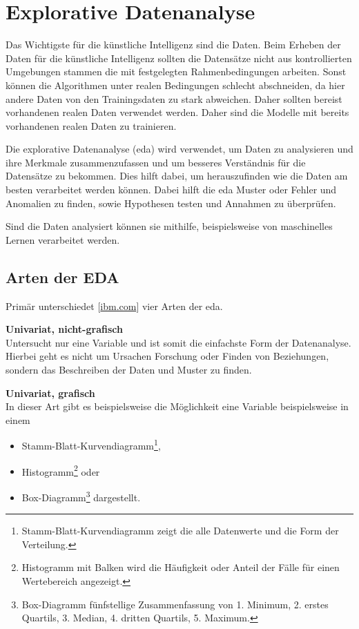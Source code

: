\chapter{Explorative Datenanalyse}
Das Wichtigste für die künstliche Intelligenz sind die Daten. Beim Erheben der Daten für die künstliche Intelligenz sollten die Datensätze nicht aus kontrollierten Umgebungen stammen die mit festgelegten Rahmenbedingungen arbeiten. Sonst können die Algorithmen unter realen Bedingungen schlecht abschneiden, da hier andere Daten von den Trainingsdaten zu stark abweichen. Daher sollten bereist vorhandenen realen Daten verwendet werden. Daher sind die Modelle mit bereits vorhandenen realen Daten zu trainieren.\vspace{0.2cm}

Die explorative Datenanalyse (\Gls{eda}) wird verwendet, um Daten zu analysieren und ihre Merkmale zusammenzufassen und um besseres Verständnis für die Datensätze zu bekommen. Dies hilft dabei, um herauszufinden wie die Daten am besten verarbeitet werden können. Dabei hilft die \Gls{eda} Muster oder Fehler und Anomalien zu finden, sowie Hypothesen testen und Annahmen zu überprüfen.\vspace{0.2cm}

Sind die Daten analysiert können sie mithilfe, beispielsweise von maschinelles Lernen verarbeitet werden.

\section{Arten der EDA}
Primär unterschiedet [\href{https://www.ibm.com/de-de/cloud/learn/exploratory-data-analysis}{ibm.com}] vier Arten der \Gls{eda}.\vspace{0.2cm}

\textbf{Univariat, nicht-grafisch}\\
Untersucht nur eine Variable und ist somit die einfachste Form der Datenanalyse. Hierbei geht es nicht um Ursachen Forschung oder Finden von Beziehungen, sondern das Beschreiben der Daten und Muster zu finden.\vspace{0.2cm}

\textbf{Univariat, grafisch}\\
In dieser Art gibt es beispielsweise die Möglichkeit eine Variable beispielsweise in einem
\begin{itemize}
	\item Stamm-Blatt-Kurvendiagramm\footnote{Stamm-Blatt-Kurvendiagramm zeigt die alle Datenwerte und die Form der Verteilung.},
	\item Histogramm\footnote{Histogramm mit Balken wird die Häufigkeit oder Anteil der Fälle für einen Wertebereich angezeigt.} oder
	\item Box-Diagramm\footnote{Box-Diagramm fünfstellige Zusammenfassung von 1. Minimum, 2. erstes Quartils, 3. Median, 4. dritten Quartils, 5. Maximum.} dargestellt.
\end{itemize}

